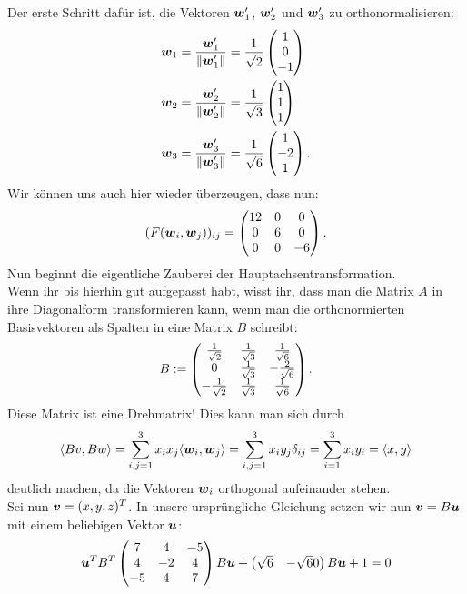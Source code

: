 \begin{Beispiel}
    Der erste Schritt dafür ist, die Vektoren ${{\text{\boldmath${w}$}}}_1'$, ${{\text{\boldmath${w}$}}}_2'$ und ${{\text{\boldmath${w}$}}}_3'$ zu orthonormalisieren:
    \begin{align*}
        {{\text{\boldmath${w}$}}}_1&=\frac{{{\text{\boldmath${w}$}}}_1'}{\Vert {{\text{\boldmath${w}$}}}_1' \Vert} = \frac{1}{\sqrt{2}}\begin{pmatrix}1\\0\\-1\end{pmatrix} \\
        {{\text{\boldmath${w}$}}}_2&=\frac{{{\text{\boldmath${w}$}}}_2'}{\Vert {{\text{\boldmath${w}$}}}_2' \Vert} = \frac{1}{\sqrt{3}}\begin{pmatrix}1\\1\\1\end{pmatrix} \\
        {{\text{\boldmath${w}$}}}_3&=\frac{{{\text{\boldmath${w}$}}}_3'}{\Vert {{\text{\boldmath${w}$}}}_3' \Vert} = \frac{1}{\sqrt{6}}\begin{pmatrix}1\\-2\\1\end{pmatrix}.
    \end{align*}
    Wir können uns auch hier wieder überzeugen, dass nun:
    \begin{equation*}
        (F({{\text{\boldmath${w}$}}}_i,{{\text{\boldmath${w}$}}}_j))_{ij}=\begin{pmatrix}12&0&0\\0&6&0\\0&0&-6\end{pmatrix}.
    \end{equation*}
    Nun beginnt die eigentliche Zauberei der Hauptachsentransformation.\\
    Wenn ihr bis hierhin gut aufgepasst habt, wisst ihr, dass man die Matrix $A$ in ihre Diagonalform transformieren kann, wenn man die orthonormierten Basisvektoren als Spalten in eine Matrix $B$ schreibt:
    \begin{equation*}
        B:=\begin{pmatrix}\frac{1}{\sqrt{2}}&\frac{1}{\sqrt{3}}&\frac{1}{\sqrt{6}}\\0&\frac{1}{\sqrt{3}}&-\frac{2}{\sqrt{6}}\\-\frac{1}{\sqrt{2}}&\frac{1}{\sqrt{3}}&\frac{1}{\sqrt{6}}\end{pmatrix}.
    \end{equation*}
    Diese Matrix ist eine Drehmatrix! Dies kann man sich durch
    \begin{equation*}
        \langle Bv, Bw \rangle = \sum_{i,j=1}^{3}x_ix_j\langle {{\text{\boldmath${w}$}}}_i, {{\text{\boldmath${w}$}}}_j \rangle = \sum_{i,j=1}^{3} x_i y_j \delta_{ij} = \sum_{i=1}^{3} x_i y_i = \langle x,y \rangle
    \end{equation*}
    deutlich machen, da die Vektoren ${{\text{\boldmath${w}$}}}_i$ orthogonal aufeinander stehen. \\
    Sei nun ${{\text{\boldmath${v}$}}}=(x,y,z)^T$. In unsere ursprüngliche Gleichung setzen wir nun ${{\text{\boldmath${v}$}}}=B{{\text{\boldmath${u}$}}}$ mit einem beliebigen Vektor ${{\text{\boldmath${u}$}}}$:
    \begin{align*}
        \uvec^T B^T \Matrix{7&4&-5\\4&-2&4\\-5&4&7}B\uvec + \Matrix{\sqrt{6}&-\sqrt{6} 0}B\uvec + 1 = 0 \\

\end{align*}
\end{Beispiel}
